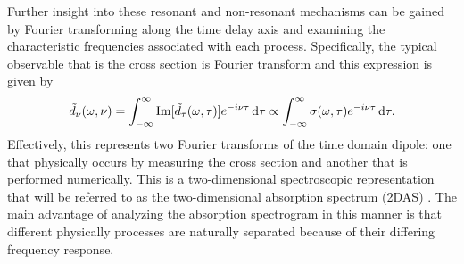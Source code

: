 Further insight into these resonant and non-resonant mechanisms can be gained by Fourier transforming along the time delay axis and examining the characteristic frequencies associated with each process.  Specifically, the typical observable that is the cross section is Fourier transform and this expression is given by
\begin{equation}
\label{eqn:2DAS_fourier_transform}
	\tilde{d}_\nu(\omega, \nu)=\int_{-\infty}^{\infty}\mathrm{Im}[\tilde{d}_\tau(\omega, \tau)]e^{-i\nu\tau}\mathop{}\!\mathrm{d}\tau\propto\int_{-\infty}^{\infty}\sigma(\omega, \tau)e^{-i\nu\tau}\mathop{}\!\mathrm{d}\tau.
\end{equation}  
Effectively, this represents two Fourier transforms of the time domain dipole: one that physically occurs by measuring the cross section and another that is performed numerically.  This is a two-dimensional spectroscopic representation that will be referred to as the two-dimensional absorption spectrum (2DAS) \cite{blattermannTwodimensionalSpectralInterpretation2014, blattermannImpulsiveControlAtomic2016}. The main advantage of analyzing the absorption spectrogram in this manner is that different physically processes are naturally separated because of their differing frequency response.

